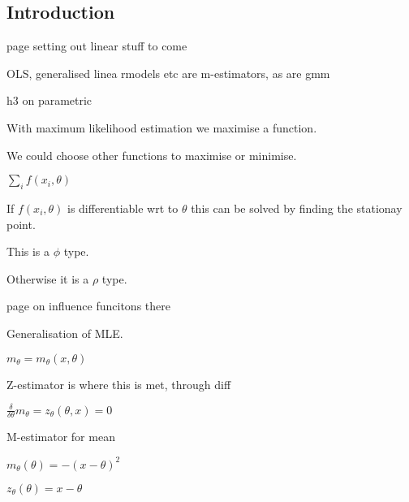 
\subsection{Introduction}

page setting out linear stuff to come

OLS, generalised linea rmodels etc are m-estimators, as are gmm

h3 on parametric

With maximum likelihood estimation we maximise a function.

We could choose other functions to maximise or minimise.

\(\sum_i f(x_i, \theta )\)

If \(f(x_i, \theta )\) is differentiable wrt to \(\theta \) this can be solved by finding the stationay point.

This is a \(\phi \) type.

Otherwise it is a \(\rho \) type.

 

page on influence funcitons there

Generalisation of MLE.

\(m_\theta =m_\theta (x, \theta )\)

Z-estimator is where this is met, through diff

\(\frac{\delta }{\delta \theta }m_\theta =z_\theta (\theta , x)=0\)

M-estimator for mean 

\(m_\theta (\theta )=-(x-\theta )^2\)

\(z_\theta (\theta )=x-\theta \)
